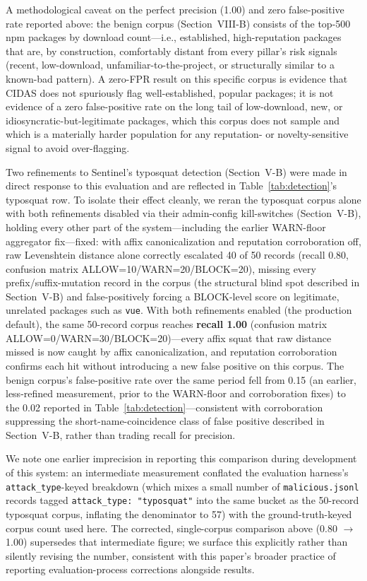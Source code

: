 \documentclass[journal]{IEEEtran}
\begin{document}
A methodological caveat on the perfect precision (1.00) and zero false-positive rate reported above: the
benign corpus (Section~VIII-B) consists of the top-500 npm packages by download count---i.e., established,
high-reputation packages that are, by construction, comfortably distant from every pillar's risk signals
(recent, low-download, unfamiliar-to-the-project, or structurally similar to a known-bad pattern). A
zero-FPR result on this specific corpus is evidence that CIDAS does not spuriously flag well-established,
popular packages; it is not evidence of a zero false-positive rate on the long tail of low-download,
new, or idiosyncratic-but-legitimate packages, which this corpus does not sample and which is a materially
harder population for any reputation- or novelty-sensitive signal to avoid over-flagging.

Two refinements to Sentinel's typosquat detection (Section~V-B) were made in direct response to this
evaluation and are reflected in Table~\ref{tab:detection}'s typosquat row. To isolate their effect cleanly,
we reran the typosquat corpus alone with both refinements disabled via their admin-config kill-switches
(Section~V-B), holding every other part of the system---including the earlier WARN-floor aggregator
fix---fixed: with affix canonicalization and reputation corroboration off, raw Levenshtein distance alone
correctly escalated 40 of 50 records (recall 0.80, confusion matrix ALLOW=10/WARN=20/BLOCK=20), missing every
prefix/suffix-mutation record in the corpus (the structural blind spot described in Section~V-B) and
false-positively forcing a BLOCK-level score on legitimate, unrelated packages such as \texttt{vue}. With both
refinements enabled (the production default), the same 50-record corpus reaches \textbf{recall 1.00}
(confusion matrix ALLOW=0/WARN=30/BLOCK=20)---every affix squat that raw distance missed is now caught by
affix canonicalization, and reputation corroboration confirms each hit without introducing a new false
positive on this corpus. The benign corpus's false-positive rate over the same period fell from 0.15 (an
earlier, less-refined measurement, prior to the WARN-floor and corroboration fixes) to the 0.02 reported in
Table~\ref{tab:detection}---consistent with corroboration suppressing the short-name-coincidence class of
false positive described in Section~V-B, rather than trading recall for precision.

We note one earlier imprecision in reporting this comparison during development of this system: an
intermediate measurement conflated the evaluation harness's \texttt{attack\_type}-keyed breakdown (which
mixes a small number of \texttt{malicious.jsonl} records tagged \texttt{attack\_type: "typosquat"} into the
same bucket as the 50-record typosquat corpus, inflating the denominator to 57) with the ground-truth-keyed
corpus count used here. The corrected, single-corpus comparison above (0.80 $\rightarrow$ 1.00) supersedes
that intermediate figure; we surface this explicitly rather than silently revising the number, consistent
with this paper's broader practice of reporting evaluation-process corrections alongside results.
\end{document}
